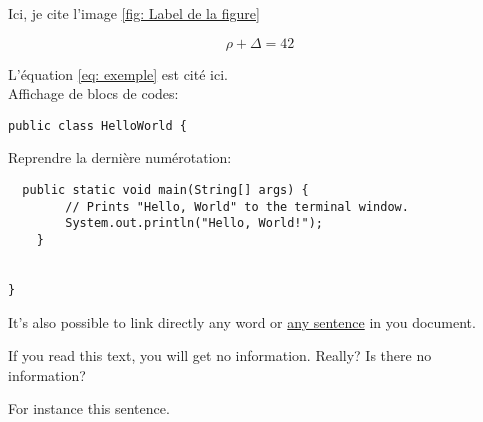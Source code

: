 \documentclass{rapportUHA40}
\begin{document}

Ici, je cite l'image \ref{fig: Label de la figure}


\begin{equation} \label{eq: exemple}
  \rho + \Delta = 42
\end{equation}

L'équation \ref{eq: exemple} est cité ici. \\

Affichage de blocs de codes:
\begin{verbatim}
public class HelloWorld {
\end{verbatim}

Reprendre la dernière numérotation:
\begin{verbatim}
  public static void main(String[] args) {
        // Prints "Hello, World" to the terminal window.
        System.out.println("Hello, World!");
    }


}
\end{verbatim}

It's also possible to link directly any word or \hyperlink{thesentence}{any
  sentence} in you document.

If you read this text, you will get no information. Really? Is there no
information?

For instance \hypertarget{thesentence}{this sentence}.
\end{document}
